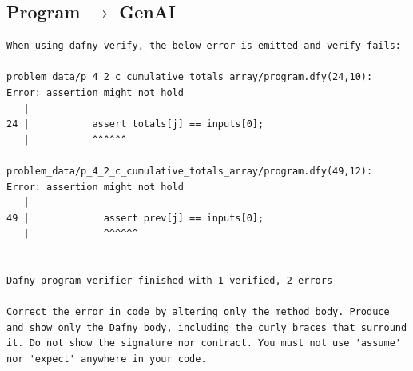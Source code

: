 \documentclass{article}
\begin{document}
\subsection*{Program $\rightarrow$ GenAI}
\begin{lstlisting}
When using dafny verify, the below error is emitted and verify fails:

problem_data/p_4_2_c_cumulative_totals_array/program.dfy(24,10): Error: assertion might not hold
   |
24 |           assert totals[j] == inputs[0];
   |           ^^^^^^

problem_data/p_4_2_c_cumulative_totals_array/program.dfy(49,12): Error: assertion might not hold
   |
49 |             assert prev[j] == inputs[0];
   |             ^^^^^^


Dafny program verifier finished with 1 verified, 2 errors

Correct the error in code by altering only the method body. Produce and show only the Dafny body, including the curly braces that surround it. Do not show the signature nor contract. You must not use 'assume' nor 'expect' anywhere in your code.
\end{lstlisting}
\end{document}
